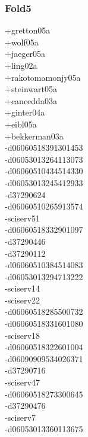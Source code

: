 \begin{multicols}{4}
\subsubsection*{Fold5}
+gretton05a\\
+wolf05a\\
+jaeger05a\\
+ling02a\\
+rakotomamonjy05a\\
+steinwart05a\\
+cancedda03a\\
+ginter04a\\
+eibl05a\\
+bekkerman03a\\
-d06060518391301453\\
-d06053013264113073\\
-d06060510434514330\\
-d06053013245412933\\
-d37290624\\
-d06060510265913574\\
-sciserv51\\
-d06060518332901097\\
-d37290446\\
-d37290112\\
-d06060510384514083\\
-d06053013294713222\\
-sciserv14\\
-sciserv22\\
-d06060518285500732\\
-d06060518331601080\\
-sciserv18\\
-d06060518322601004\\
-d06090909534026371\\
-d37290716\\
-sciserv47\\
-d06060518273300645\\
-d37290476\\
-sciserv7\\
-d06053013360113675\\

\end{multicols}

